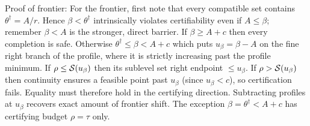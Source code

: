 Proof of frontier: 
For the frontier, first note that every compatible set contains $\theta^\dagger=A/r$. Hence $\beta<\theta^\dagger$ intrinsically violates certifiability even if $A\le\beta$; remember $\beta<A$ is the stronger, direct barrier. If $\beta\ge A+c$ then every completion is safe. Otherwise $\theta^\dagger\le\beta<A+c$ which puts $u_\beta=\beta-A$ on the fine right branch of the profile, where it is strictly increasing past the profile minimum. If $\rho\le\mathcal S(u_\beta)$ then its sublevel set right endpoint $\le u_\beta$. If $\rho>\mathcal S(u_\beta)$ then continuity ensures a feasible point past $u_\beta$ (since $u_\beta<c$), so certification fails. Equality must therefore hold in the certifying direction. Subtracting profiles at $u_\beta$ recovers exact amount of frontier shift. The exception $\beta=\theta^\dagger<A+c$ has certifying budget $\rho=\tau$ only. 

